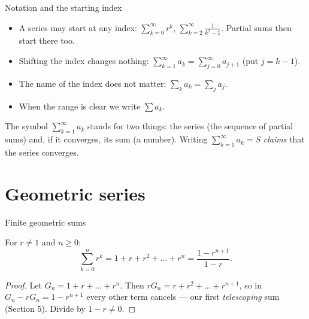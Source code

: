 \documentclass[10pt]{wosm-slides}
\begin{document}
\begin{frame}{Notation and the starting index}
  \begin{itemize}
    \item A series may start at any index:
      $\displaystyle\sum_{k=0}^{\infty} r^k$, \quad $\displaystyle\sum_{k=2}^{\infty} \frac{1}{k^2-1}$.
      Partial sums then start there too.
    \item Shifting the index changes nothing:
      $\displaystyle\sum_{k=1}^{\infty} a_k = \sum_{j=0}^{\infty} a_{j+1}$ \quad (put $j = k-1$).
    \item The name of the index does not matter: $\sum_k a_k = \sum_j a_j$.
    \item When the range is clear we write $\sum a_k$.
  \end{itemize}
  \begin{warning}
    The symbol $\sum_{k=1}^\infty a_k$ stands for two things: the series (the sequence of
    partial sums) and, if it converges, its sum (a number).
    Writing $\sum_{k=1}^\infty a_k = S$ \emph{claims} that the series converges.
  \end{warning}
\end{frame}

\section{Geometric series}

\begin{frame}{Finite geometric sums}
  \begin{lemma}
    For $r \ne 1$ and $n \ge 0$:
    \[ \sum_{k=0}^{n} r^k = 1 + r + r^2 + \dots + r^n = \frac{1 - r^{n+1}}{1 - r} . \]
  \end{lemma}
  \pause
  \begin{proof}
    Let $G_n = 1 + r + \dots + r^n$. Then $r G_n = r + r^2 + \dots + r^{n+1}$, so in
    $G_n - r G_n = 1 - r^{n+1}$ every other term cancels --- our first
    \emph{telescoping} sum (Section 5). Divide by $1 - r \ne 0$.
  \end{proof}
\end{frame}
\end{document}
